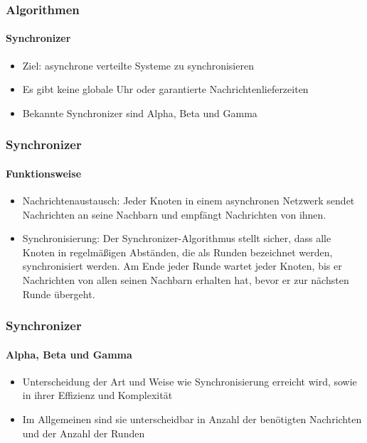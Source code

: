 \begin{frame}
  \frametitle{Algorithmen}
  \framesubtitle{Synchronizer}
  \begin{itemize}
    \item Ziel: asynchrone verteilte Systeme zu synchronisieren
    \item Es gibt keine globale Uhr oder garantierte Nachrichtenlieferzeiten
    \item  Bekannte Synchronizer sind Alpha, Beta und Gamma 
  \end{itemize}
\end{frame}

\begin{frame}
  \frametitle{Synchronizer}
  \framesubtitle{Funktionsweise}
  \begin{itemize}
  \item Nachrichtenaustausch: Jeder Knoten in einem asynchronen Netzwerk sendet Nachrichten an seine Nachbarn und empfängt Nachrichten von ihnen.
  \item Synchronisierung: Der Synchronizer-Algorithmus stellt sicher, dass alle Knoten in regelmäßigen Abständen, die als Runden bezeichnet werden, synchronisiert werden. Am Ende jeder Runde wartet jeder Knoten, bis er Nachrichten von allen seinen Nachbarn erhalten hat, bevor er zur nächsten Runde übergeht.
  \end{itemize}   
\end{frame}

\begin{frame}
  \frametitle{Synchronizer}
  \framesubtitle{Alpha, Beta und Gamma}
  \begin{itemize}
  \item Unterscheidung der Art und Weise wie Synchronisierung erreicht wird, sowie in ihrer Effizienz und Komplexität
  \item Im Allgemeinen sind sie unterscheidbar in Anzahl der benötigten Nachrichten und der Anzahl der Runden
  \end{itemize}   
\end{frame}
